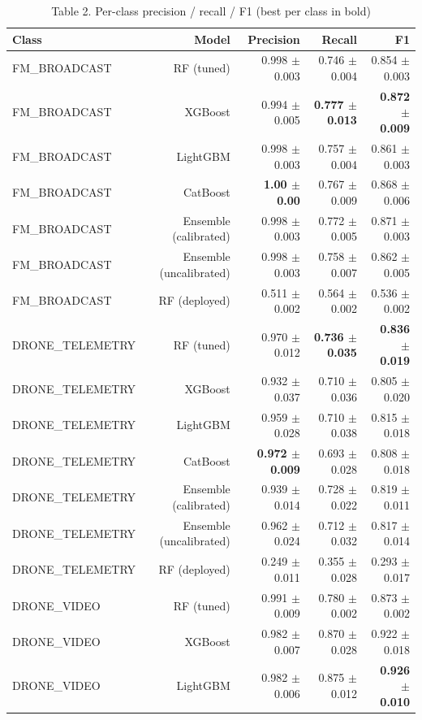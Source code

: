 \begin{table}[htbp]
\centering
\small
\caption{Table 2. Per-class precision / recall / F1 (best per class in bold)}
\label{tab:table2_per_class}
\begin{tabular}{lrrrr}
\toprule
Class & Model & Precision & Recall & F1 \\
\midrule
FM\_BROADCAST & RF (tuned) & 0.998 $\pm$ 0.003 & 0.746 $\pm$ 0.004 & 0.854 $\pm$ 0.003 \\
FM\_BROADCAST & XGBoost & 0.994 $\pm$ 0.005 & \textbf{0.777 $\pm$ 0.013} & \textbf{0.872 $\pm$ 0.009} \\
FM\_BROADCAST & LightGBM & 0.998 $\pm$ 0.003 & 0.757 $\pm$ 0.004 & 0.861 $\pm$ 0.003 \\
FM\_BROADCAST & CatBoost & \textbf{1.00 $\pm$ 0.00} & 0.767 $\pm$ 0.009 & 0.868 $\pm$ 0.006 \\
FM\_BROADCAST & Ensemble (calibrated) & 0.998 $\pm$ 0.003 & 0.772 $\pm$ 0.005 & 0.871 $\pm$ 0.003 \\
FM\_BROADCAST & Ensemble (uncalibrated) & 0.998 $\pm$ 0.003 & 0.758 $\pm$ 0.007 & 0.862 $\pm$ 0.005 \\
FM\_BROADCAST & RF (deployed) & 0.511 $\pm$ 0.002 & 0.564 $\pm$ 0.002 & 0.536 $\pm$ 0.002 \\
DRONE\_TELEMETRY & RF (tuned) & 0.970 $\pm$ 0.012 & \textbf{0.736 $\pm$ 0.035} & \textbf{0.836 $\pm$ 0.019} \\
DRONE\_TELEMETRY & XGBoost & 0.932 $\pm$ 0.037 & 0.710 $\pm$ 0.036 & 0.805 $\pm$ 0.020 \\
DRONE\_TELEMETRY & LightGBM & 0.959 $\pm$ 0.028 & 0.710 $\pm$ 0.038 & 0.815 $\pm$ 0.018 \\
DRONE\_TELEMETRY & CatBoost & \textbf{0.972 $\pm$ 0.009} & 0.693 $\pm$ 0.028 & 0.808 $\pm$ 0.018 \\
DRONE\_TELEMETRY & Ensemble (calibrated) & 0.939 $\pm$ 0.014 & 0.728 $\pm$ 0.022 & 0.819 $\pm$ 0.011 \\
DRONE\_TELEMETRY & Ensemble (uncalibrated) & 0.962 $\pm$ 0.024 & 0.712 $\pm$ 0.032 & 0.817 $\pm$ 0.014 \\
DRONE\_TELEMETRY & RF (deployed) & 0.249 $\pm$ 0.011 & 0.355 $\pm$ 0.028 & 0.293 $\pm$ 0.017 \\
DRONE\_VIDEO & RF (tuned) & 0.991 $\pm$ 0.009 & 0.780 $\pm$ 0.002 & 0.873 $\pm$ 0.002 \\
DRONE\_VIDEO & XGBoost & 0.982 $\pm$ 0.007 & 0.870 $\pm$ 0.028 & 0.922 $\pm$ 0.018 \\
DRONE\_VIDEO & LightGBM & 0.982 $\pm$ 0.006 & 0.875 $\pm$ 0.012 & \textbf{0.926 $\pm$ 0.010} \\

\end{tabular}
\end{table}
